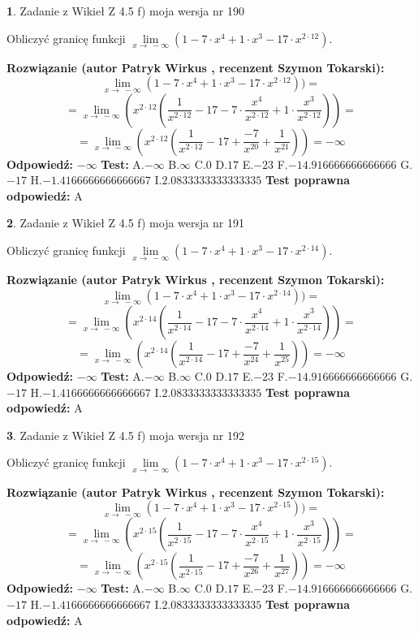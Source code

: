 \documentclass[12pt, a4paper]{article}
\theoremstyle{definition} %
\newtheorem{zad}{}
\newcommand{\zadStart}[1]{\begin{zad}#1\newline}
\newcommand{\zadStop}{\end{zad}}
\newcommand{\rozwStart}[2]{\noindent \textbf{Rozwiązanie (autor #1 , recenzent #2): }\newline}
\newcommand{\rozwStop}{\newline}
\newcommand{\odpStart}{\noindent \textbf{Odpowiedź:}\newline}
\newcommand{\odpStop}{\newline}
\newcommand{\testStart}{\noindent \textbf{Test:}\newline}
\newcommand{\testStop}{\newline}
\newcommand{\kluczStart}{\noindent \textbf{Test poprawna odpowiedź:}\newline}
\newcommand{\kluczStop}{\newline}
\begin{document}
\zadStart{Zadanie z Wikieł Z 4.5 f) moja wersja nr 190}


Obliczyć granicę funkcji  $\lim\limits_{x\to\ -\infty}(1 - 7 \cdot x^{4}+1 \cdot x^{3}- 17 \cdot x^{2\cdot12})$.
\zadStop
\rozwStart{Patryk Wirkus}{Szymon Tokarski}
$$\lim\limits_{x\to\ -\infty}(1 - 7 \cdot x^{4}+1 \cdot x^{3}- 17 \cdot x^{2\cdot12}))=$$
$$=\lim\limits_{x\to\ -\infty}(x^{2\cdot12}(\frac{1}{x^{2\cdot12}}-17 -7 \cdot \frac{x^{4}}{x^{2\cdot12}}+1 \cdot \frac{x^{3}}{x^{2\cdot12}}))=$$
$$=\lim\limits_{x\to\ -\infty}(x^{2\cdot12}(\frac{1}{x^{2\cdot12}}-17 + \frac{-7}{x^{20}}+ \frac{1}{x^{21}}))=-\infty$$
\rozwStop
\odpStart
$-\infty$
\odpStop
\testStart
A.$-\infty$ B.$\infty$ C.$0$ D.$17$ E.$-23$
F.$-14.916666666666666$ G.$-17$
H.$-1.4166666666666667$
I.$2.0833333333333335$
\testStop
\kluczStart
A
\kluczStop



\zadStart{Zadanie z Wikieł Z 4.5 f) moja wersja nr 191}


Obliczyć granicę funkcji  $\lim\limits_{x\to\ -\infty}(1 - 7 \cdot x^{4}+1 \cdot x^{3}- 17 \cdot x^{2\cdot14})$.
\zadStop
\rozwStart{Patryk Wirkus}{Szymon Tokarski}
$$\lim\limits_{x\to\ -\infty}(1 - 7 \cdot x^{4}+1 \cdot x^{3}- 17 \cdot x^{2\cdot14}))=$$
$$=\lim\limits_{x\to\ -\infty}(x^{2\cdot14}(\frac{1}{x^{2\cdot14}}-17 -7 \cdot \frac{x^{4}}{x^{2\cdot14}}+1 \cdot \frac{x^{3}}{x^{2\cdot14}}))=$$
$$=\lim\limits_{x\to\ -\infty}(x^{2\cdot14}(\frac{1}{x^{2\cdot14}}-17 + \frac{-7}{x^{24}}+ \frac{1}{x^{25}}))=-\infty$$
\rozwStop
\odpStart
$-\infty$
\odpStop
\testStart
A.$-\infty$ B.$\infty$ C.$0$ D.$17$ E.$-23$
F.$-14.916666666666666$ G.$-17$
H.$-1.4166666666666667$
I.$2.0833333333333335$
\testStop
\kluczStart
A
\kluczStop



\zadStart{Zadanie z Wikieł Z 4.5 f) moja wersja nr 192}


Obliczyć granicę funkcji  $\lim\limits_{x\to\ -\infty}(1 - 7 \cdot x^{4}+1 \cdot x^{3}- 17 \cdot x^{2\cdot15})$.
\zadStop
\rozwStart{Patryk Wirkus}{Szymon Tokarski}
$$\lim\limits_{x\to\ -\infty}(1 - 7 \cdot x^{4}+1 \cdot x^{3}- 17 \cdot x^{2\cdot15}))=$$
$$=\lim\limits_{x\to\ -\infty}(x^{2\cdot15}(\frac{1}{x^{2\cdot15}}-17 -7 \cdot \frac{x^{4}}{x^{2\cdot15}}+1 \cdot \frac{x^{3}}{x^{2\cdot15}}))=$$
$$=\lim\limits_{x\to\ -\infty}(x^{2\cdot15}(\frac{1}{x^{2\cdot15}}-17 + \frac{-7}{x^{26}}+ \frac{1}{x^{27}}))=-\infty$$
\rozwStop
\odpStart
$-\infty$
\odpStop
\testStart
A.$-\infty$ B.$\infty$ C.$0$ D.$17$ E.$-23$
F.$-14.916666666666666$ G.$-17$
H.$-1.4166666666666667$
I.$2.0833333333333335$
\testStop
\kluczStart
A
\kluczStop
\end{document}
